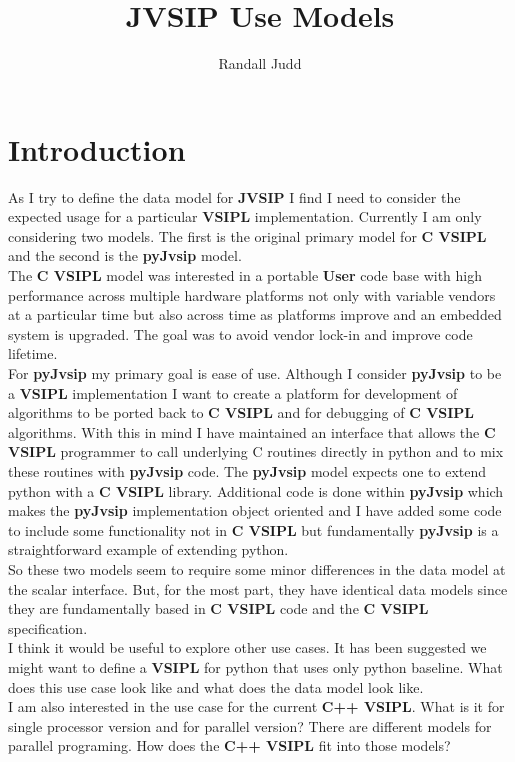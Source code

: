 \documentclass[11pt, oneside]{article}
\title{JVSIP Use Models}
\author{Randall Judd}
\newcommand{\cvl}{\ttbf{C VSIPL}}
\newcommand{\pyjv}{{\ttbf{pyJvsip}}}
\newcommand{\ttbf}[1]{{\ttfamily \bfseries #1}}
\newcommand{\jv}{{\ttbf{JVSIP}}}
\begin{document}
\maketitle
 \section{Introduction}
As I try to define the data model for \jv{} I find I need to consider the expected usage for a particular \ttbf{VSIPL} implementation.  Currently I am only considering two models. The first is the original primary model for \cvl{} and the second is the \pyjv{} model. 
\\[6pt]
The \cvl{} model was interested in a portable \ttbf{User} code base with high performance across multiple hardware platforms not only with variable vendors at a particular time but also across time as platforms improve and an embedded system is upgraded. The goal was to avoid vendor lock-in and improve code lifetime.
\\[6pt]
For \pyjv{} my primary goal is ease of use.  Although I consider \pyjv{} to be a \ttbf{VSIPL} implementation I want to create a platform for development of algorithms to be ported back to \cvl{} and for debugging of \cvl{} algorithms.  With this in mind I have maintained an interface that allows the \cvl{} programmer to call underlying C routines directly in python and to mix these routines with \pyjv{} code.  The \pyjv{} model expects one to extend python with a \cvl{} library.  Additional code is done within \pyjv{} which makes the \pyjv{} implementation object oriented and I have added some code to include some functionality not in \cvl{} but fundamentally \pyjv{} is a straightforward example of extending python.
\\[6pt]
So these two models seem to require some minor differences in the data model at the scalar interface. But, for the most part, they have identical data models since they are fundamentally based in \cvl{} code and the \cvl{} specification.
\\[6pt]
I think it would be useful to explore other use cases.  It has been suggested we might want to define a \ttbf{VSIPL} for python that uses only python baseline. What does this use case look like and what does the data model look like.
\\[6pt]
I am also interested in the use case for the current \ttbf{C++ VSIPL}. What is it for single processor version and for parallel version? There are different models for parallel programing.  How does the \ttbf{C++ VSIPL} fit into those models?
\end{document}

